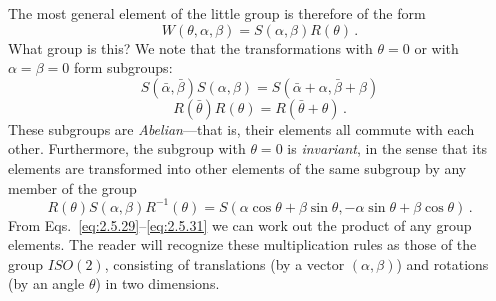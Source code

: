 The most general element of the little group is therefore of the form
\begin{equation}
W(\theta,\alpha,\beta)=S(\alpha,\beta)R(\theta)\,.
\tag{2.5.28}\label{eq:2.5.28}
\end{equation}
What group is this? We note that the transformations with $\theta=0$ or with
$\alpha=\beta=0$ form subgroups:
\begin{equation}
S(\bar\alpha,\bar\beta)S(\alpha,\beta)
=S(\bar\alpha+\alpha,\bar\beta+\beta)
\tag{2.5.29}\label{eq:2.5.29}
\end{equation}
\begin{equation}
R(\bar\theta)R(\theta)=R(\bar\theta+\theta)\,.
\tag{2.5.30}\label{eq:2.5.30}
\end{equation}
These subgroups are \emph{Abelian}---that is, their elements all commute with
each other. Furthermore, the subgroup with $\theta=0$ is \emph{invariant}, in
the sense that its elements are transformed into other elements of the same
subgroup by any member of the group
\begin{equation}
R(\theta)S(\alpha,\beta)R^{-1}(\theta)
=S(\alpha\cos\theta+\beta\sin\theta,
-\alpha\sin\theta+\beta\cos\theta)\,.
\tag{2.5.31}\label{eq:2.5.31}
\end{equation}
From Eqs.~\eqref{eq:2.5.29}--\eqref{eq:2.5.31} we can work out the product of any group elements.
The reader will recognize these multiplication rules as those of the group
$ISO(2)$, consisting of translations (by a vector $(\alpha,\beta)$) and
rotations (by an angle $\theta$) in two dimensions.

